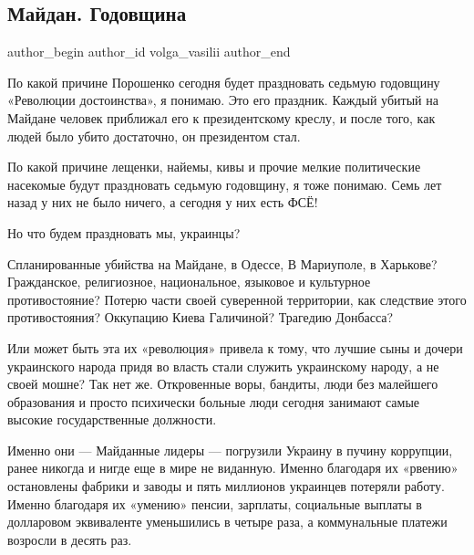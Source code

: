  
 
 
 
 
 
\subsection{Майдан. Годовщина}
\label{sec:21_11_2020.fb.volga_vasilii.1.maidan_godovschina}
\ifcmt
	author_begin
   author_id volga_vasilii
	author_end
\fi

По какой причине Порошенко сегодня будет праздновать седьмую годовщину
«Революции достоинства», я понимаю. Это его праздник. Каждый убитый на Майдане
человек приближал его к президентскому креслу, и после того, как людей было
убито достаточно, он президентом стал.

По какой причине лещенки, найемы, кивы и прочие мелкие политические насекомые
будут праздновать седьмую годовщину, я тоже понимаю. Семь лет назад у них не
было ничего, а сегодня у них есть ФСЁ! 

Но что будем праздновать мы, украинцы?

Спланированные убийства на Майдане, в Одессе, В Мариуполе, в Харькове?
Гражданское, религиозное, национальное, языковое и культурное противостояние?
Потерю части своей суверенной территории, как следствие этого противостояния?
Оккупацию Киева Галичиной? Трагедию Донбасса?

Или может быть эта их «революция» привела к тому, что лучшие сыны и дочери
украинского народа придя во власть стали служить украинскому народу, а не своей
мошне? Так нет же. Откровенные воры, бандиты, люди без малейшего образования и
просто психически больные люди сегодня занимают самые высокие государственные
должности. 

Именно они --- Майданные лидеры --- погрузили Украину в пучину коррупции, ранее
никогда и нигде еще в мире не виданную. Именно благодаря их «рвению»
остановлены фабрики и заводы и пять миллионов украинцев потеряли работу. Именно
благодаря их «умению» пенсии, зарплаты, социальные выплаты в долларовом
эквиваленте уменьшились в четыре раза, а коммунальные платежи возросли в десять
раз. 

